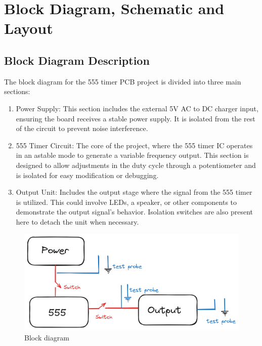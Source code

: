 \documentclass[a4paper,11pt]{article}%
\begin{document}
\section{Block Diagram, Schematic and Layout}
\subsection{Block Diagram Description}
The block diagram for the 555 timer PCB project is divided into three main sections:

\begin{enumerate}
	\item Power Supply: This section includes the external 5V AC to DC charger input, ensuring the board receives a stable power supply. It is isolated from the rest of the circuit to prevent noise interference.
	\item 555 Timer Circuit: The core of the project, where the 555 timer IC operates in an astable mode to generate a variable frequency output. This section is designed to allow adjustments in the duty cycle through a potentiometer and is isolated for easy modification or debugging.
	\item Output Unit: Includes the output stage where the signal from the 555 timer is utilized. This could involve LEDs, a speaker, or other components to demonstrate the output signal's behavior. Isolation switches are also present here to detach the unit when necessary.
\end{enumerate}

\begin{figure}[H]
	\centering
	\includegraphics[scale=0.4]{figures/ne555_blockdiagram}
	\caption{Block diagram}
\end{figure}
\end{document}
